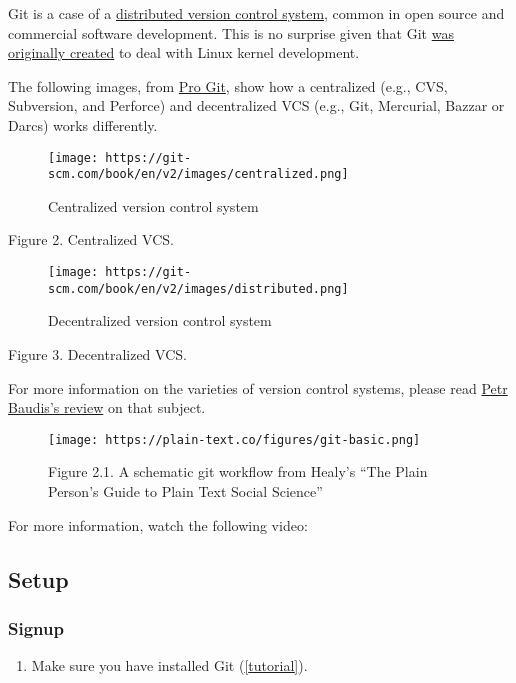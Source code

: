 \documentclass[
]{book}
\providecommand{\tightlist}{%
  \setlength{\itemsep}{0pt}\setlength{\parskip}{0pt}}
\begin{document}
Git is a case of a \href{https://en.wikipedia.org/wiki/Distributed_version_control}{distributed version control system}, common in open source and commercial software development. This is no surprise given that Git \href{https://lkml.org/lkml/2005/4/6/121}{was originally created} to deal with Linux kernel development.

The following images, from \href{git-scm.com}{Pro Git}, show how a centralized (e.g., CVS, Subversion, and Perforce) and decentralized VCS (e.g., Git, Mercurial, Bazzar or Darcs) works differently.

\begin{figure}
\centering
\texttt{[image: https://git-scm.com/book/en/v2/images/centralized.png]}
\caption{Centralized version control system}
\end{figure}

Figure 2. Centralized VCS.

\begin{figure}
\centering
\texttt{[image: https://git-scm.com/book/en/v2/images/distributed.png]}
\caption{Decentralized version control system}
\end{figure}

Figure 3. Decentralized VCS.

For more information on the varieties of version control systems, please read \href{https://pdfs.semanticscholar.org/4490/4c70bc91e1bed4fe02b9e2282f031b7c90ea.pdf}{Petr Baudis's review} on that subject.

\begin{figure}
\centering
\texttt{[image: https://plain-text.co/figures/git-basic.png]}
\caption{Figure 2.1. A schematic git workflow from Healy's ``The Plain Person's Guide to Plain Text Social Science''}
\end{figure}

For more information, watch the following video:

\hypertarget{setup}{%
\subsection{Setup}\label{setup}}

\hypertarget{signup}{%
\subsubsection{Signup}\label{signup}}

\begin{enumerate}
\def\labelenumi{\arabic{enumi}.}
\tightlist
\item
  Make sure you have installed Git (\href{https://happygitwithr.com/install-git.html\#install-git}{{[}tutorial{]}}).
\end{enumerate}
\end{document}
